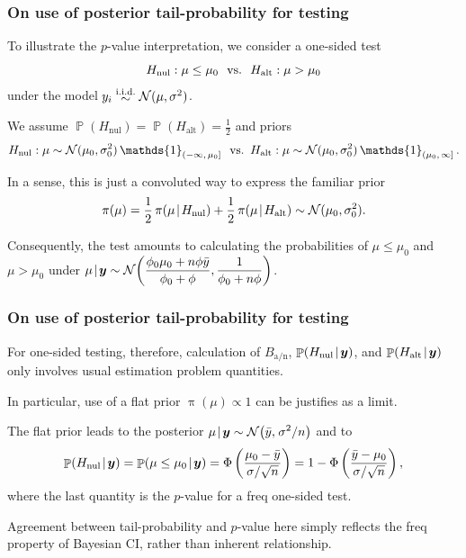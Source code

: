 \documentclass[18pt]{beamer}
\newcommand{\defineTightSpacing}{%
	\setlength{\abovedisplayskip}{.25\baselineskip}%
	\setlength{\belowdisplayskip}{.25\baselineskip}%
}
\newcommand{\given}{\mskip.7\thinmuskip | \mskip.7\thinmuskip}
\newcommand{\thinnerspace}{\mskip.5\thinmuskip}
\DeclareMathOperator{\probability}{\mathbb{P}}
\newcommand{\indicator}{\operatorname{\mathds{1}}}
\newcommand{\iidSim}{\mathrel{\raisebox{-.3ex}{$\overset{\text{i.i.d.}}{\sim}$}}}
\newcommand{\normalDist}{\operatorname{\mathcal{N}}}
\newcommand{\density}{\operatorname{\pi}}
\newcommand{\by}{\bm{y}}
\newcommand{\hypothesis}{H}
\newcommand{\nullSub}{\mathrm{nul}}
\newcommand{\altSub}{\mathrm{alt}}
\newcommand{\bayesFacAlt}{B_{\mathrm{a} / \mathrm{n}}}
\begin{document}
\begin{frame}
\frametitle{On use of posterior tail-probability for testing}
To illustrate the $p$-value interpretation, we consider a one-sided test
\begin{equation*} \defineTightSpacing%
\hypothesis_\nullSub: \mu \leq \mu_0 
	\ \text{ vs.\ } \ 
	\hypothesis_\altSub: \mu > \mu_0
\end{equation*}
under the model $y_i \iidSim \normalDist(\mu, \sigma^2)$.

\pause
\smallskip
We assume $\probability(\hypothesis_\nullSub) = \probability(\hypothesis_\altSub) = \frac12$ and priors
\begin{equation*} \defineTightSpacing%
\hypothesis_\nullSub: \mu \sim \normalDist(\mu_0, \sigma_0^2) \indicator_{(-\infty, \, \mu_0]}
	\, \text{ vs.\ } \,
	\hypothesis_\altSub: \mu \sim \normalDist(\mu_0, \sigma_0^2) \indicator_{(\mu_0, \, \infty]}.
\end{equation*}

\pause
In a sense, this is just a convoluted way to express the familiar prior
\begin{equation*} \defineTightSpacing%
\density(\mu) 
	= \frac{1}{2} \density(\mu \given \hypothesis_\nullSub) + \frac12 \density(\mu \given \hypothesis_\altSub)
	\sim \normalDist(\mu_0, \sigma_0^2).
\end{equation*}

\pause
Consequently, the test amounts to calculating the probabilities of $\mu \leq \mu_0$ and $\mu > \mu_0 $ under 
$\displaystyle \mu \given \by \sim \normalDist\!\left( \frac{\phi_0 \mu_0 + n \phi \bar{y}}{\phi_0 + \phi}, \frac{1}{\phi_0 + n \phi} \right)$.
\end{frame}


\begin{frame}
\frametitle{On use of posterior tail-probability for testing}
For one-sided testing, therefore, calculation of $\bayesFacAlt$, $\probability(\hypothesis_\nullSub \given \by)$, and $\probability(\hypothesis_\altSub \given \by)$ only involves usual estimation problem quantities.

\pause
In particular, use of a flat prior $\density(\mu) \propto 1$ can be justifies as a limit.

\pause
\smallskip
The flat prior leads to the posterior $\displaystyle \mu \given \by \sim \normalDist\!\left( \bar{y}, \thinnerspace \sigma^2 / n \right)$ and to
\begin{equation*} \defineTightSpacing%
\probability(\hypothesis_\nullSub \given \by)
	= \probability(\mu \leq \mu_0 \given \by) 
	= \Phi\left( \frac{\mu_0 - \bar{y}}{\sigma / \sqrt{n}} \right) 
	= 1 - \Phi\left( \frac{\bar{y} - \mu_0}{\sigma / \sqrt{n}} \right),
\end{equation*}
where the last quantity is the $p$-value for a freq one-sided test.

\pause
\smallskip
Agreement between tail-probability and $p$-value here simply reflects the freq property of Bayesian CI, rather than inherent relationship.
\end{frame}
\end{document}
